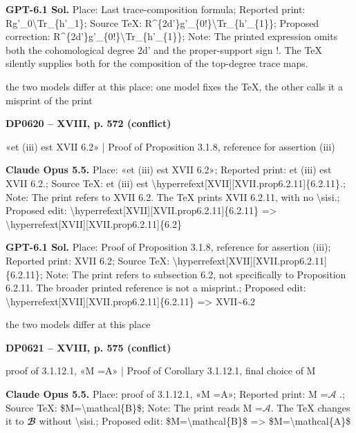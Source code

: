 \textbf{GPT-6.1 Sol.} Place: Last trace-composition formula; Reported print: Rg'\_0\textbackslash{}Tr\_\{h'\_1\}; Source TeX: R\textasciicircum{}\{2d'\}g'\_\{0!\}\textbackslash{}Tr\_\{h'\_\{1\}\}; Proposed correction: R\textasciicircum{}\{2d'\}g'\_\{0!\}\textbackslash{}Tr\_\{h'\_\{1\}\}; Note: The printed expression omits both the cohomological degree 2d' and the proper-support sign !. The TeX silently supplies both for the composition of the top-degree trace maps.\par
the two models differ at this place: one model fixes the TeX, the other calls it a misprint of the print\par
\par\noindent\hypertarget{DP0620}{}\textbf{DP0620 -- XVIII, p. 572 (conflict)}\par
«et (iii) est XVII 6.2» | Proof of Proposition 3.1.8, reference for assertion (iii)\par
\textbf{Claude Opus 5.5.} Place: «et (iii) est XVII 6.2»; Reported print: et (iii) est XVII 6.2.; Source TeX: et (iii) est \textbackslash{}hyperrefext[XVII][XVII.prop6.2.11]\{6.2.11\}.; Note: The print refers to XVII 6.2. The TeX prints XVII 6.2.11, with no \textbackslash{}sisi.; Proposed edit: \textbackslash{}hyperrefext[XVII][XVII.prop6.2.11]\{6.2.11\} =\allowbreak > \textbackslash{}hyperrefext[XVII][XVII.prop6.2.11]\{6.2\}\par
\textbf{GPT-6.1 Sol.} Place: Proof of Proposition 3.1.8, reference for assertion (iii); Reported print: XVII 6.2; Source TeX: \textbackslash{}hyperrefext[XVII][XVII.prop6.2.11]\{6.2.11\}; Note: The print refers to subsection 6.2, not specifically to Proposition 6.2.11. The broader printed reference is not a misprint.; Proposed edit: \textbackslash{}hyperrefext[XVII][XVII.prop6.2.11]\{6.2.11\} =\allowbreak > XVII\textasciitilde{}6.2\par
the two models differ at this place\par
\par\noindent\hypertarget{DP0621}{}\textbf{DP0621 -- XVIII, p. 575 (conflict)}\par
proof of 3.1.12.1, «M =\allowbreak  A» | Proof of Corollary 3.1.12.1, final choice of M\par
\textbf{Claude Opus 5.5.} Place: proof of 3.1.12.1, «M =\allowbreak  A»; Reported print: M =\allowbreak  \ensuremath{𝒜} .; Source TeX: \$M=\allowbreak \textbackslash{}mathcal\{B\}\$; Note: The print reads M =\allowbreak  \ensuremath{𝒜}. The TeX changes it to \ensuremath{𝓑} without \textbackslash{}sisi.; Proposed edit: \$M=\allowbreak \textbackslash{}mathcal\{B\}\$ =\allowbreak > \$M=\allowbreak \textbackslash{}mathcal\{A\}\$\par
